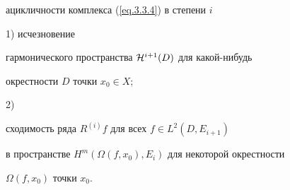 ацикличности комплекса (\ref{eq.3.3.4}) в степени $i$





1) исчезновение


гармонического пространства ${\cal H}^{i+1} (D)$ для какой-нибудь


окрестности $D$ точки $x_0 \in X$;





2)


сходимость ряда $R^{(i)}f$ для всех $f \in L^2 (D, E_{i+1})$


в пространстве $H^m (\Omega (f,x_0), E_i)$ для некоторой окрестности


$\Omega (f,x_0)$ точки $x_0$.








